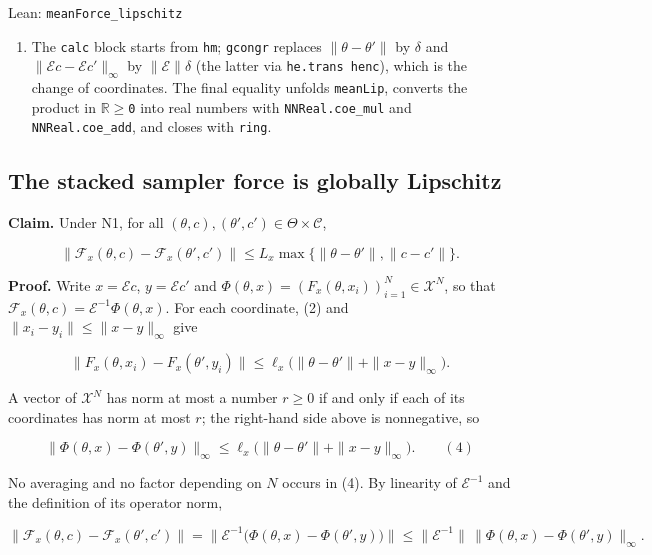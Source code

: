 \documentclass[11pt,a4paper]{report}
\begin{document}
\begin{leanbox}{Lean: \texttt{meanForce\_\allowbreak{}lipschitz}}
\begin{enumerate}
\item The \texttt{calc} block starts from \texttt{hm}; \texttt{gcongr} replaces \(\|\theta-\theta'\|\) by \(\delta\) and \(\|\mathcal Ec-\mathcal Ec'\|_\infty\) by \(\|\mathcal E\|\delta\) (the latter via \texttt{he.\allowbreak{}trans henc}), which is the change of coordinates. The final equality unfolds \texttt{mean\allowbreak{}Lip}, converts the product in \texttt{\ensuremath{\mathbb R}\ensuremath{\ge}0} into real numbers with \texttt{NNReal.\allowbreak{}coe\_\allowbreak{}mul} and \texttt{NNReal.\allowbreak{}coe\_\allowbreak{}add}, and closes with \texttt{ring}.

\end{enumerate}
\end{leanbox}
\subsection{\texorpdfstring{The stacked sampler force is globally Lipschitz}{The stacked sampler force is globally Lipschitz}}


\textbf{Claim.} Under N1, for all \((\theta,c),(\theta',c')\in\Theta\times\mathcal C\),


\[\bigl\|\mathcal F_x(\theta,c)-\mathcal F_x(\theta',c')\bigr\|\le L_x\max\{\|\theta-\theta'\|,\|c-c'\|\}.\]


\textbf{Proof.} Write \(x=\mathcal Ec\), \(y=\mathcal Ec'\) and \(\Phi(\theta,x)=(F_x(\theta,x_i))_{i=1}^N\in\mathcal X^N\), so that \(\mathcal F_x(\theta,c)=\mathcal E^{-1}\Phi(\theta,x)\). For each coordinate, (2) and \(\|x_i-y_i\|\le\|x-y\|_\infty\) give


\[\bigl\|F_x(\theta,x_i)-F_x(\theta',y_i)\bigr\|\le\ell_x\bigl(\|\theta-\theta'\|+\|x-y\|_\infty\bigr).\]


A vector of \(\mathcal X^N\) has norm at most a number \(r\ge0\) if and only if each of its coordinates has norm at most \(r\); the right-hand side above is nonnegative, so


\[\bigl\|\Phi(\theta,x)-\Phi(\theta',y)\bigr\|_\infty\le\ell_x\bigl(\|\theta-\theta'\|+\|x-y\|_\infty\bigr).\qquad(4)\]


No averaging and no factor depending on \(N\) occurs in (4). By linearity of \(\mathcal E^{-1}\) and the definition of its operator norm,


\[\bigl\|\mathcal F_x(\theta,c)-\mathcal F_x(\theta',c')\bigr\|=\bigl\|\mathcal E^{-1}\bigl(\Phi(\theta,x)-\Phi(\theta',y)\bigr)\bigr\|\le\|\mathcal E^{-1}\|\,\bigl\|\Phi(\theta,x)-\Phi(\theta',y)\bigr\|_\infty .\]
\end{document}
